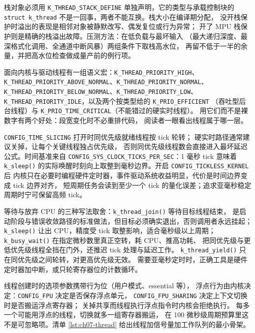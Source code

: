 \documentclass[12pt,a4paper,fontset=fandol]{ctexbook}
\newcommand{\Fn}[1]{\texttt{#1()}}
\newcommand{\Tp}[1]{\texttt{#1}}
\newcommand{\Bk}{\discretionary{}{}{}}
\begin{document}
\begin{warning}[title={静态栈估小的表现是直接跑飞}]
栈对象必须用 \Tp{K\_THREAD\_STACK\_DEFINE} 单独声明，它的类型与承载控制块的
\Tp{struct k\_thread} 不是一回事，两者不能互换。栈大小在编译期分配，
没开栈保护时溢出的表现是相邻对象被静默改写、偶发复位或行为异常；
开了 MPU 栈保护则是精确的栈溢出故障。压测方法：在低负载与最坏输入
（最大递归深度、最深格式化调用、全通道中断风暴）两组条件下取栈高水位，
再留不低于一半的余量，并把高水位检查做成量产前的例行项。
\end{warning}

面向内核与驱动线程有一组语义宏：\Tp{K\_{\Bk}THREAD\_{\Bk}PRIORITY\_{\Bk}HIGH}、
\Tp{K\_{\Bk}THREAD\_{\Bk}PRIORITY\_{\Bk}ABOVE\_{\Bk}NORMAL}、\Tp{K\_{\Bk}THREAD\_{\Bk}PRIORITY\_{\Bk}NORMAL}、
\Tp{K\_{\Bk}THREAD\_{\Bk}PRIORITY\_{\Bk}BELOW\_{\Bk}NORMAL}、\Tp{K\_{\Bk}THREAD\_{\Bk}PRIORITY\_{\Bk}LOW}、
\Tp{K\_{\Bk}THREAD\_{\Bk}PRIORITY\_{\Bk}IDLE}，以及两个按类型给的 \Tp{K\_{\Bk}PRIO\_{\Bk}EFFICIENT}
（吞吐型后台线程）与 \Tp{K\_{\Bk}PRIO\_{\Bk}TIME\_{\Bk}CRITICAL}（不能错过的硬实时线程）。
用它们而不是裸数字有两个好处：段宽变化时不必重排代码，
阅读者一眼看出线程属于哪一层。

\Tp{CONFIG\_TIME\_SLICING} 打开时同优先级就绪线程按 tick 轮转；
硬实时路径通常建议关掉，让每个关键线程独占优先级，
否则同优先级线程数会直接进入最坏延迟公式。时间基准来自
\Tp{CONFIG\_SYS\_CLOCK\_TICKS\_PER\_SEC}：1 毫秒 tick 意味着 \Fn{k\_sleep}
的实际唤醒时刻向上取整到毫秒边界。开启 \Tp{CONFIG\_TICKLESS\_KERNEL} 后
内核只在必要时编程硬件定时器，事件驱动系统收益明显，代价是时间边界变成 tick 边界对齐，
短周期任务会读到至少一个 tick 的量化误差；追求亚毫秒稳定周期时宁可保留高频 tick。

等待与放弃 CPU 的三种写法取舍：\Fn{k\_thread\_join} 等待目标线程结束，
是启动阶段与错误收敛路径的标准做法，但目标必须确实退出，否则调用者永远挂起；
\Fn{k\_sleep} 让出 CPU，精度受 tick 取整影响，适合毫秒级以上周期；
\Fn{k\_busy\_wait} 在指定微秒数里真正空转，耗 CPU、推高功耗、
把同优先级与更低优先级线程全挡在门外，还推迟 tick 处理与延迟工作。
\Fn{k\_thread\_yield} 只在同优先级之间轮转，对更高优先级无效。
需要亚毫秒定时时，正确工具是硬件定时器加中断，或只轮寄存器位的计数循环。

线程创建时的选项参数携带行为位（用户模式、essential 等），
浮点行为由内核决定：\Tp{CONFIG\_FPU} 决定是否保存浮点单元，
\Tp{CONFIG\_FPU\_SHARING} 决定上下文切换时是否搬运浮点寄存器；
关掉共享而线程执行浮点指令时内核会拒绝执行。
每多一个可能用浮点的线程，切换就多一组寄存器搬运，
在 100 微秒级周期预算里这不是可忽略项。清单 \ref{lst:ch07-thread}
给出线程加信号量加工作队列的最小骨架。
\end{document}
